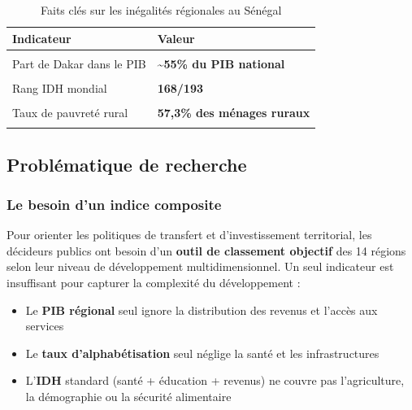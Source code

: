 \documentclass[
]{article}
\providecommand{\tightlist}{%
  \setlength{\itemsep}{0pt}\setlength{\parskip}{0pt}}
\begin{document}
\begin{longtable}[t]{>{\raggedright\arraybackslash}p{10cm}>{}l}
\caption{\label{tab:contexte-stats}Faits clés sur les inégalités régionales au Sénégal}\\
\toprule
Indicateur & Valeur\\
\midrule
\cellcolor{gray!10}{Population nationale} & \textcolor[HTML]{B92346}{\textbf{\cellcolor{gray!10}{17,2 millions d'habitants}}}\\
Part de Dakar dans le PIB & \textcolor[HTML]{B92346}{\textbf{\textasciitilde{}55\% du PIB national}}\\
\cellcolor{gray!10}{IDH national (PNUD 2023)} & \textcolor[HTML]{B92346}{\textbf{\cellcolor{gray!10}{0,511}}}\\
Rang IDH mondial & \textcolor[HTML]{B92346}{\textbf{168/193}}\\
\cellcolor{gray!10}{Taux de pauvreté national (EHCVM 2021)} & \textcolor[HTML]{B92346}{\textbf{\cellcolor{gray!10}{37,8\% des ménages}}}\\
\addlinespace
Taux de pauvreté rural & \textcolor[HTML]{B92346}{\textbf{57,3\% des ménages ruraux}}\\
\cellcolor{gray!10}{Nombre de régions administratives} & \textcolor[HTML]{B92346}{\textbf{\cellcolor{gray!10}{14 régions}}}\\
\bottomrule
\end{longtable}
\endgroup{}

\subsection{Problématique de
recherche}\label{probluxe9matique-de-recherche}

\subsubsection{Le besoin d'un indice
composite}\label{le-besoin-dun-indice-composite}

Pour orienter les politiques de transfert et d'investissement
territorial, les décideurs publics ont besoin d'un \textbf{outil de
classement objectif} des 14 régions selon leur niveau de développement
multidimensionnel. Un seul indicateur est insuffisant pour capturer la
complexité du développement :

\begin{itemize}
\tightlist
\item
  Le \textbf{PIB régional} seul ignore la distribution des revenus et
  l'accès aux services
\item
  Le \textbf{taux d'alphabétisation} seul néglige la santé et les
  infrastructures
\item
  L'\textbf{IDH} standard (santé + éducation + revenus) ne couvre pas
  l'agriculture, la démographie ou la sécurité alimentaire
\end{itemize}
\end{document}

